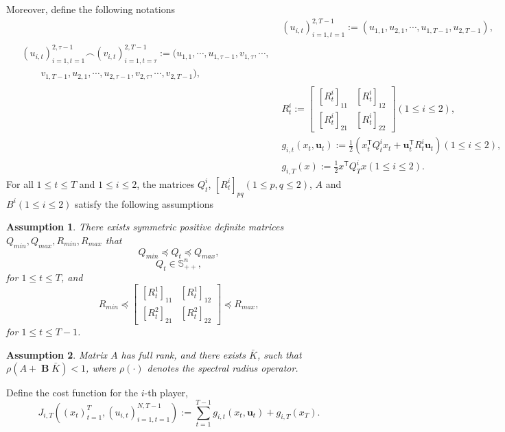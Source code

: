 \documentclass{article}
\newcommand{\transpose}{\mathsf{T}}
\DeclareMathOperator{\contB}{\mathbf{B}}
\newtheorem{assumption}{Assumption}
\begin{document}
Moreover, define the following notations
\begin{align}
    &(u_{i,t})_{i=1,t=1}^{2,T-1} := (u_{1,1},u_{2,1},\cdots, u_{1,T-1},u_{2,T-1}),\\
    \begin{split}
         &(u_{i,t})_{i=1,t=1}^{2,\tau-1} \frown (v_{i,t})_{i=1,t=\tau}^{2,T-1}:=(u_{1,1},\cdots,u_{1,\tau-1},v_{1,\tau},\cdots,\\
    &\qquad v_{1,T-1},u_{2,1},\cdots,u_{2,\tau-1},v_{2,\tau},\cdots,v_{2,T-1} ),
    \end{split}
   \\ 
   & R_{t}^{i} := 
   \begin{bmatrix}
       [R_{t}^{i}]_{11} & [R_{t}^{i}]_{12}\\
       [R_{t}^{i}]_{21} & [R_{t}^{i}]_{22}
   \end{bmatrix}(1\leq i \leq 2),\\
    &g_{i,t}(x_{t}, \mathbf{u}_{t}) := \frac{1}{2}(x_{t}^{\mathsf{T}}Q_{t}^{i}x_{t} + 
    \mathbf{u}_{t}^{\transpose}R_{t}^{i}\mathbf{u}_{t})(1\leq i \leq 2),\\
    &g_{i,T}(x) := \frac{1}{2} x^{\mathsf{T}}Q_{T}^{i}x(1\leq i \leq 2).
\end{align}
For all $1 \leq t \leq T$ and $1\leq i\leq 2$, the matrices $Q_{t}^{i}$, $[R_{t}^{i}]_{pq}(1\leq p,q \leq 2)$, $A$ and $B^{i}(1\leq i \leq 2)$ satisfy the following assumptions
\begin{assumption}\label{assumption:bounds}
    There exists symmetric positive definite matrices $Q_{min}, Q_{max}, R_{min}, R_{max}$ that
    \begin{equation}
        Q_{min} \preceq Q_{t} \preceq Q_{max},
    \end{equation}
    \begin{equation}
        Q_{t} \in \mathbb{S}^{n}_{++},
    \end{equation}
    for $1\leq t \leq T$, and
    \begin{equation}\label{eq:positiveR}
        R_{min} \preceq 
        \begin{bmatrix}
            [R_{t}^{1}]_{11} & [R_{t}^{1}]_{12}\\
            [R_{t}^{2}]_{21} & [R_{t}^{2}]_{22}
        \end{bmatrix}
        \preceq R_{max},
    \end{equation}
    for $1 \leq t \leq T-1$.
\end{assumption}
\begin{assumption}\label{assumption:controllable}
    Matrix $A$ has full rank, and there exists $\bar{K}$, such that $\rho(A + \contB \bar{K}) < 1$, where $\rho(\cdot)$ denotes the spectral radius operator.
\end{assumption}
Define the cost function for the $i$-th player,
\begin{equation}\label{eq:LQcost}
    J_{i,T}((x_{t})_{t=1}^{T},(u_{i,t})_{i=1,t=1}^{N,T-1}) := \sum_{t=1}^{T-1} g_{i,t}(x_{t}, \mathbf{u}_{t}) + g_{i,T}(x_{T}).
\end{equation}
\end{document}
